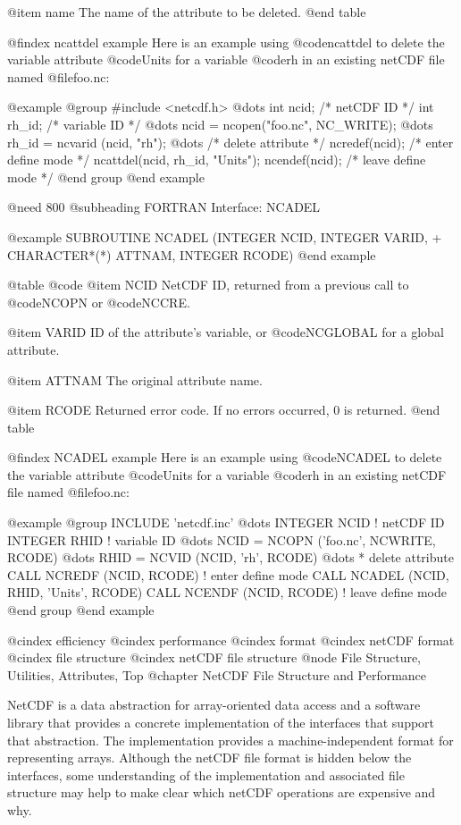 {@item name
The name of the attribute to be deleted.
@end table

@findex ncattdel example
Here is an example using @code{ncattdel} to delete the variable
attribute @code{Units} for a variable @code{rh} in an existing netCDF
file named @file{foo.nc}:

@example
@group
#include <netcdf.h>
   @dots{}
int  ncid;        /* netCDF ID */
int  rh_id;       /* variable ID */
   @dots{}
ncid = ncopen("foo.nc", NC_WRITE);
   @dots{}
rh_id = ncvarid (ncid, "rh");
   @dots{}
/* delete attribute */
ncredef(ncid);                  /* enter define mode */
ncattdel(ncid, rh_id, "Units");
ncendef(ncid);                  /* leave define mode */
@end group
@end example

@need 800
@subheading FORTRAN Interface:  NCADEL

@example
      SUBROUTINE NCADEL (INTEGER NCID, INTEGER VARID,
     +                   CHARACTER*(*) ATTNAM, INTEGER RCODE)
@end example

@table @code
@item NCID
NetCDF ID, returned from a previous call to @code{NCOPN} or @code{NCCRE}.

@item VARID
ID of the attribute's variable, or @code{NCGLOBAL} for a
global attribute.

@item ATTNAM
The original attribute name.

@item RCODE
Returned error code.  If no errors occurred, 0 is returned.
@end table

@findex NCADEL example
Here is an example using @code{NCADEL} to delete the variable attribute
@code{Units} for a variable @code{rh} in an existing netCDF file named
@file{foo.nc}:

@example
@group
      INCLUDE 'netcdf.inc'
         @dots{}
      INTEGER  NCID     ! netCDF ID
      INTEGER  RHID      ! variable ID
         @dots{}
      NCID = NCOPN ('foo.nc', NCWRITE, RCODE)
         @dots{}
      RHID = NCVID (NCID, 'rh', RCODE)
         @dots{}
* delete attribute
      CALL NCREDF (NCID, RCODE)  ! enter define mode
      CALL NCADEL (NCID, RHID, 'Units', RCODE)
      CALL NCENDF (NCID, RCODE)  ! leave define mode
@end group
@end example

@cindex efficiency
@cindex performance
@cindex format
@cindex netCDF format
@cindex file structure
@cindex netCDF file structure
@node File Structure, Utilities, Attributes, Top
@chapter NetCDF File Structure and Performance

NetCDF is a data abstraction for array-oriented data access and a software
library that provides a concrete implementation of the interfaces that
support that abstraction.  The implementation provides a
machine-independent format for representing arrays. Although
the netCDF file format is hidden below the interfaces, some
understanding of the implementation and associated file structure may
help to make clear which netCDF operations are expensive and why.

}
